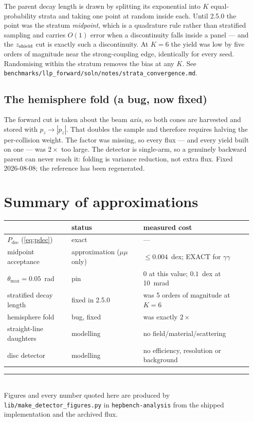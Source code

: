 \documentclass[11pt]{article}
\newcommand{\Pdec}{P_{\mathrm{dec}}}
\begin{document}
The parent decay length is drawn by splitting its exponential into $K$
equal-probability strata and taking one point at random inside each. Until
2.5.0 the point was the stratum \emph{midpoint}, which is a quadrature rule
rather than stratified sampling and carries $O(1)$ error when a discontinuity
falls inside a panel --- and the $z_{\rm shield}$ cut is exactly such a
discontinuity. At $K=6$ the yield was low by five orders of magnitude near the
strong-coupling edge, identically for every seed. Randomising within the
stratum removes the bias at any $K$. See
\texttt{benchmarks/llp_forward/soln/notes/strata\_convergence.md}.

\subsection{The hemisphere fold (a bug, now fixed)}

The forward cut is taken about the beam \emph{axis}, so both cones are
harvested and stored with $p_z\to|p_z|$. That doubles the sample and therefore
requires halving the per-collision weight. The factor was missing, so every
flux --- and every yield built on one --- was $2\times$ too large. The detector
is single-arm, so a genuinely backward parent can never reach it: folding is
variance reduction, not extra flux. Fixed 2026-08-08; the reference has been
regenerated.

\section{Summary of approximations}

\begin{center}
\begin{tabular}{lll}
\toprule
& status & measured cost \\ \midrule
$\Pdec$ (\cref{eq:pdec})           & exact & --- \\
midpoint acceptance                & approximation ($\mu\mu$ only) & $\leq0.004$~dex; EXACT for $\gamma\gamma$ \\
$\theta_{\max}=0.05$~rad           & pin & $0$ at this value; $0.1$~dex at 10~mrad \\
stratified decay length            & fixed in 2.5.0 & was 5 orders of magnitude at $K=6$ \\
hemisphere fold                    & bug, fixed & was exactly $2\times$ \\
straight-line daughters            & modelling & no field/material/scattering \\
disc detector                      & modelling & no efficiency, resolution or background \\
\bottomrule
\end{tabular}
\end{center}

\vspace{1em}
\noindent\rule{\textwidth}{0.4pt}\\[0.3em]
{\small Figures and every number quoted here are produced by
\texttt{lib/make\_detector\_figures.py} in \texttt{hepbench-analysis} from the shipped
implementation and the archived flux.}
\end{document}
